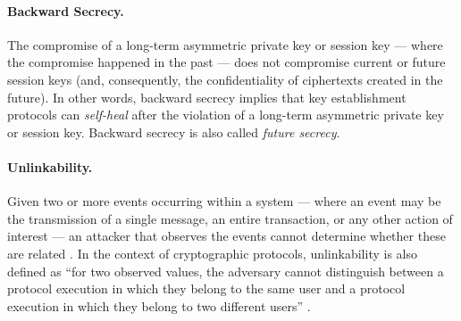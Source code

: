 \paragraph*{Backward Secrecy.} The compromise of a long-term asymmetric private key or session key --- where the compromise happened in the past --- does not compromise current or future session keys (and, consequently, the confidentiality of ciphertexts created in the future). In other words, backward secrecy implies that key establishment protocols can \textit{self-heal} after the violation of a long-term asymmetric private key or session key. Backward secrecy is also called \textit{future secrecy}.


\paragraph*{Unlinkability.} Given two or more events occurring within a system --- where an event may be the transmission of a single message, an entire transaction, or any other action of interest --- an attacker that observes the events cannot determine whether these are related \cite{hutchison_linking_2013}. In the context of cryptographic protocols, unlinkability is also defined as ``for two observed values, the adversary cannot distinguish between a protocol execution in which they belong to the same user and a protocol execution in which they belong to two different users'' \cite{bhargavan_verifpal_2020}.